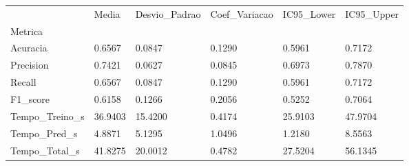 \begin{tabular}{llllll}
\toprule
 & Media & Desvio_Padrao & Coef_Variacao & IC95_Lower & IC95_Upper \\
Metrica &  &  &  &  &  \\
\midrule
Acuracia & 0.6567 & 0.0847 & 0.1290 & 0.5961 & 0.7172 \\
Precision & 0.7421 & 0.0627 & 0.0845 & 0.6973 & 0.7870 \\
Recall & 0.6567 & 0.0847 & 0.1290 & 0.5961 & 0.7172 \\
F1_score & 0.6158 & 0.1266 & 0.2056 & 0.5252 & 0.7064 \\
Tempo_Treino_s & 36.9403 & 15.4200 & 0.4174 & 25.9103 & 47.9704 \\
Tempo_Pred_s & 4.8871 & 5.1295 & 1.0496 & 1.2180 & 8.5563 \\
Tempo_Total_s & 41.8275 & 20.0012 & 0.4782 & 27.5204 & 56.1345 \\
\bottomrule
\end{tabular}
